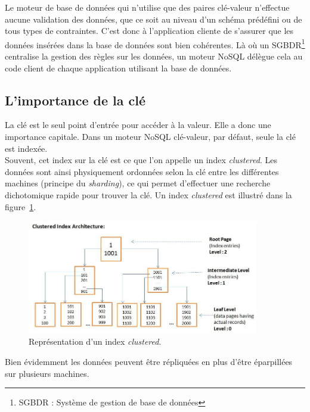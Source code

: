 	Le moteur de base de données qui n'utilise que des paires clé-valeur n'effectue aucune validation des données, que ce soit au niveau d'un schéma prédéfini ou de tous types de contraintes. C'est donc à l'application cliente de s'assurer que les données insérées dans la base de données sont bien cohérentes. Là où un SGBDR\footnote{SGBDR : Système de gestion de base de données} centralise la gestion des règles sur les données, un moteur NoSQL délègue cela au code client de chaque application utilisant la base de données.

\subsection{L'importance de la clé}
	La clé est le seul point d'entrée pour accéder à la valeur. Elle a donc une importance capitale. Dans un moteur NoSQL clé-valeur, par défaut, seule la clé est indexée.\\

	Souvent, cet index sur la clé est ce que l'on appelle un index \textit{clustered}. Les données sont ainsi physiquement ordonnées selon la clé entre les différentes machines (principe du \textit{sharding}), ce qui permet d'effectuer une recherche dichotomique rapide pour trouver la clé. Un index \textit{clustered} est illustré dans la figure~\ref{clusteredIndex}.

	\begin{figure}[H]
		\centering
		\includegraphics[width=0.9\textwidth]{images/clusteredIndex.jpg}
		\caption{Représentation d'un index \textit{clustered}.\cite{clusteredIndex}}
		\label{clusteredIndex}
	\end{figure}

	Bien évidemment les données peuvent être répliquées en plus d'être éparpillées sur plusieurs machines.
